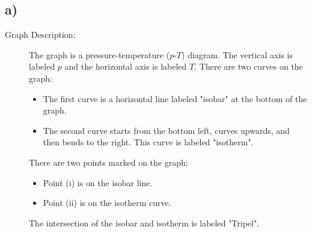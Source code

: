 

\subsection*{a)}
\begin{description}
    \item[Graph Description:] The graph is a pressure-temperature ($p$-$T$) diagram. The vertical axis is labeled $p$ and the horizontal axis is labeled $T$. There are two curves on the graph:
    \begin{itemize}
        \item The first curve is a horizontal line labeled "isobar" at the bottom of the graph.
        \item The second curve starts from the bottom left, curves upwards, and then bends to the right. This curve is labeled "isotherm".
    \end{itemize}
    There are two points marked on the graph:
    \begin{itemize}
        \item Point (i) is on the isobar line.
        \item Point (ii) is on the isotherm curve.
    \end{itemize}
    The intersection of the isobar and isotherm is labeled "Tripel".
\end{description}